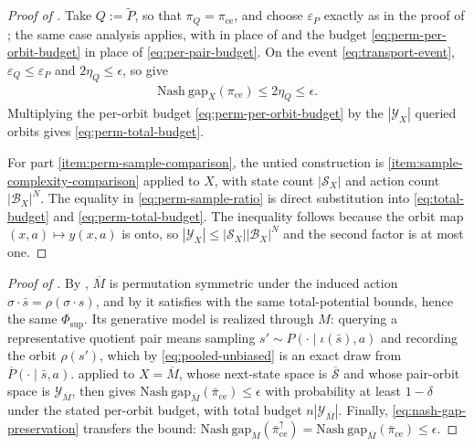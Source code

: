 \documentclass{article}
\theoremstyle{plain}
\theoremstyle{definition}
\theoremstyle{remark}
\newcommand{\Nash}{\mathrm{Nash\ gap}}
\newcommand{\St}{\mathcal{S}}
\newcommand{\abs}[1]{\left\lvert#1\right\rvert}
\newcommand{\quotient}[1]{\overline{#1}}
\newcommand{\Phisup}{\Phi_{\mathrm{sup}}}
\newcommand{\pice}{\bar\pi_{\mathrm{ce}}}
\newcommand{\trP}{\widetilde{P}}
\begin{document}
\begin{proof}[Proof of ]
Take $Q:=\trP$, so that $\pi_Q=\pi_{\mathrm{ce}}$, and choose
$\varepsilon_P$ exactly as in the proof of ; the
same case analysis applies, with  in
place of  and the budget
\eqref{eq:perm-per-orbit-budget} in place of \eqref{eq:per-pair-budget}. On
the event \eqref{eq:transport-event}, $\varepsilon_Q\le\varepsilon_P$ and
$2\eta_Q\le\epsilon$, so 
give
\begin{align*}
  \Nash_X(\pi_{\mathrm{ce}})
  \le
  2\eta_Q
  \le
  \epsilon.
\end{align*}
Multiplying the per-orbit budget \eqref{eq:perm-per-orbit-budget} by the
$\abs{\mathcal Y_X}$ queried orbits gives \eqref{eq:perm-total-budget}.

For part \ref{item:perm-sample-comparison}, the untied construction is
\ref{item:sample-complexity-comparison} applied
to $X$, with state count $\abs{\mathcal S_X}$ and action count
$\abs{\mathcal B_X}^N$. The equality in \eqref{eq:perm-sample-ratio} is
direct substitution into \eqref{eq:total-budget} and
\eqref{eq:perm-total-budget}. The inequality follows because the orbit map
$(x,a)\mapsto y(x,a)$ is onto, so
$\abs{\mathcal Y_X}\le\abs{\mathcal S_X}\abs{\mathcal B_X}^N$ and the second
factor is at most one.
\end{proof}

\begin{proof}[Proof of ]
By , $\quotient M$ is permutation symmetric
under the induced action
$\sigma\mathbin{\cdot}\bar s=\rho(\sigma\mathbin{\cdot}s)$, and by
 it satisfies  with the
same total-potential bounds, hence the same $\Phisup$. Its generative model
is realized through $M$: querying a representative quotient pair means
sampling $s'\sim P(\cdot\mid\iota(\bar s),a)$ and recording the orbit
$\rho(s')$, which by \eqref{eq:pooled-unbiased} is an exact draw from
$\quotient P(\cdot\mid\bar s,a)$.  applied
to $X=\quotient M$, whose next-state space is $\quotient\St$ and whose
pair-orbit space is $\mathcal Y_{\quotient M}$, then gives
$\Nash_{\quotient M}(\pice)\le\epsilon$ with probability at least $1-\delta$
under the stated per-orbit budget, with total budget
$n\abs{\mathcal Y_{\quotient M}}$. Finally,
\eqref{eq:nash-gap-preservation} transfers the bound:
$\Nash_M(\pice^\uparrow)=\Nash_{\quotient M}(\pice)\le\epsilon$.
\end{proof}
\end{document}
